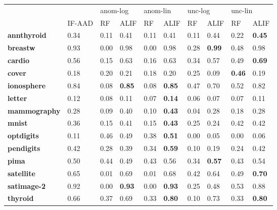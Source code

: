 \begin{adjustbox}{angle=270}
\begin{tabular}{llllllllll}
\toprule
{} &      {}  & \multicolumn{2}{l}{anom-log} & \multicolumn{2}{l}{anom-lin} & \multicolumn{2}{l}{unc-log} & \multicolumn{2}{l}{unc-lin} \\
{} & IF-AAD &       RF &   ALIF &       RF &   ALIF &      RF &   ALIF &      RF &   ALIF \\
\midrule
\textbf{annthyroid } &   0.34 &     0.11 &  0.41 &     0.11 &  0.41 &    0.11 &  0.44 &    0.22 &  \textbf{0.45} \\
\textbf{breastw    } &   0.93 &     0.00 &  0.98 &     0.00 &  0.98 &    0.28 &  \textbf{0.99} &    0.48 &  0.98 \\
\textbf{cardio     } &   0.56 &     0.15 &  0.63 &     0.16 &  0.63 &    0.34 &  0.57 &    0.49 &  \textbf{0.69} \\
\textbf{cover      } &   0.18 &     0.20 &  0.21 &     0.18 &  0.20 &    0.25 &  0.09 &    \textbf{0.46} &  0.19 \\
\textbf{ionosphere } &   0.84 &     0.08 &  \textbf{0.85} &     0.08 &  \textbf{0.85} &    0.47 &  0.70 &    0.52 &  0.82 \\
\textbf{letter     } &   0.12 &     0.08 &  0.11 &     0.07 &  \textbf{0.14} &    0.06 &  0.07 &    0.07 &  0.11 \\
\textbf{mammography} &   0.28 &     0.09 &  0.40 &     0.10 &  \textbf{0.43} &    0.04 &  0.28 &    0.18 &  0.28 \\
\textbf{mnist      } &   0.36 &     0.15 &  0.41 &     0.15 &  \textbf{0.43} &    0.25 &  0.24 &    0.42 &  0.42 \\
\textbf{optdigits  } &   0.11 &     0.46 &  0.49 &     0.38 &  \textbf{0.51} &    0.00 &  0.05 &    0.00 &  0.06 \\
\textbf{pendigits  } &   0.42 &     0.28 &  0.39 &     0.34 &  \textbf{0.59} &    0.10 &  0.19 &    0.24 &  0.42 \\
\textbf{pima       } &   0.50 &     0.44 &  0.49 &     0.43 &  0.56 &    0.34 &  \textbf{0.57} &    0.43 &  0.54 \\
\textbf{satellite  } &   0.65 &     0.01 &  0.69 &     0.01 &  0.68 &    0.42 &  0.64 &    0.49 &  \textbf{0.70} \\
\textbf{satimage-2 } &   0.92 &     0.00 &  \textbf{0.93} &     0.00 &  \textbf{0.93} &    0.25 &  0.48 &    0.53 &  0.88 \\
\textbf{thyroid    } &   0.66 &     0.37 &  0.69 &     0.33 &  \textbf{0.80} &    0.10 &  0.73 &    0.33 &  \textbf{0.80} \\

\end{tabular}
\end{adjustbox}
